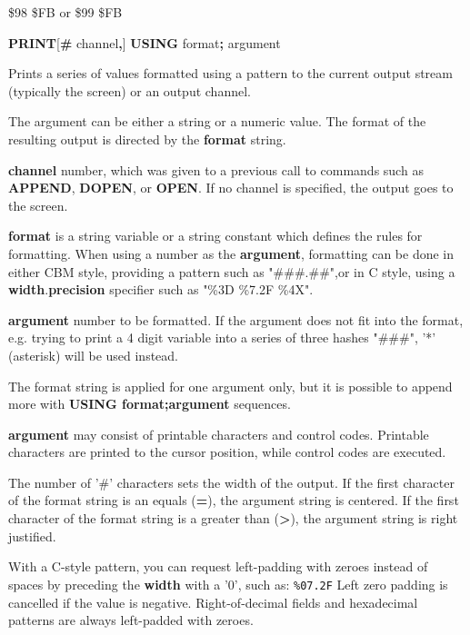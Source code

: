 \begin{description}[leftmargin=2cm,style=nextline]
\item [Token:]    \$98 \$FB or \$99 \$FB

\item [Format:]   {\bf PRINT}[{\bf\#} channel{\bf,}] {\bf USING} format{\bf;} argument

\item [Usage:]    Prints a series of values formatted using a pattern to the current output stream (typically the screen) or an output channel.

                  The argument can be either a string or a numeric value. The format of the resulting output is directed by the {\bf format} string.

                  {\bf channel} number, which was given to a previous call to commands such as {\bf APPEND}, {\bf DOPEN}, or {\bf OPEN}. If no channel is specified, the output goes to the screen.

                  {\bf format} is a string variable or a string constant which defines the rules for formatting. When using a number as the {\bf argument}, formatting can be done in either CBM style, providing a pattern such as "\#\#\#.\#\#",or in C style, using a {\bf width}.{\bf precision} specifier such as "\%3D \%7.2F \%4X".

                  {\bf argument} number to be formatted. If the argument does not fit into the format, e.g. trying to print a 4 digit variable into a series of three hashes "\#\#\#", '*' (asterisk) will be used instead.

\item [Remarks:]  The format string is applied for one argument only, but it is possible to append more with {\bf USING format;argument} sequences.

                  {\bf argument} may consist of printable characters and control codes. Printable characters are printed to the cursor position, while control codes are executed.

                  The number of '\#' characters sets the width of the output. If the first character of the format string is an equals ({\bf =}), the argument string is centered. If the first character of the format string is a greater than ({\bf >}), the argument string is right justified.

                  With a C-style pattern, you can request left-padding with zeroes instead of spaces by preceding the {\bf width} with a '0', such as: \texttt{\%07.2F} Left zero padding is cancelled if the value is negative. Right-of-decimal fields and hexadecimal patterns are always left-padded with zeroes.


\end{description}
